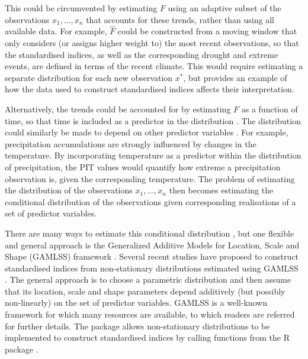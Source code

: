This could be circumvented by estimating \(F\) using an adaptive subset of the observations \(x_{1}, \dots, x_{n}\) that accounts for these trends, rather than using all available data. For example, \(\hat{F}\) could be constructed from a moving window that only considers (or assigns higher weight to) the most recent observations, so that the standardised indices, as well as the corresponding drought and extreme events, are defined in terms of the recent climate. This would require estimating a separate distribution for each new observation \(x^{*}\), but provides an example of how the data used to construct standardised indices affects their interpretation.

Alternatively, the trends could be accounted for by estimating \(F\) as a function of time, so that time is included as a predictor in the distribution \citep{RussoEtAl2013}. The distribution could similarly be made to depend on other predictor variables \citep{LiEtAl2015}. For example, precipitation accumulations are strongly influenced by changes in the temperature. By incorporating temperature as a predictor within the distribution of precipitation, the PIT values would quantify how extreme a precipitation observation is, given the corresponding temperature. The problem of estimating the distribution of the observations \(x_{1}, \dots, x_{n}\) then becomes estimating the conditional distribution of the observations given corresponding realisations of a set of predictor variables.

There are many ways to estimate this conditional distribution \citep[see e.g.][]{KneibEtAl2023}, but one flexible and general approach is the Generalized Additive Models for Location, Scale and Shape (GAMLSS) framework \citep{RigbyEtAl2005}. Several recent studies have proposed to construct standardised indices from non-stationary distributions estimated using GAMLSS \citep[e.g.][]{WangEtAl2015,RashidBeecham2019,ShaoEtAl2022}. The general approach is to choose a parametric distribution and then assume that its location, scale and shape parameters depend additively (but possibly non-linearly) on the set of predictor variables. GAMLSS is a well-known framework for which many resources are available, to which readers are referred for further details. The  package allows non-stationary distributions to be implemented to construct standardised indices by calling functions from the  R package \citep{StasinopoulosEtAl2008,StasinopoulosEtAl2017}.

